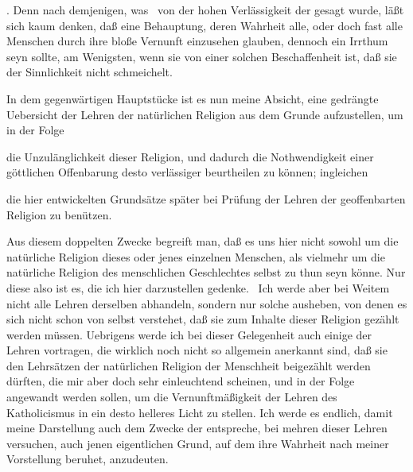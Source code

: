 \begin{aufza}
\begin{aufzb}
\begin{RWanm}
\end{RWanm}
\item {}. Denn nach demjenigen, was \ von der hohen Verlässigkeit der  gesagt wurde, läßt sich kaum denken, daß eine Behauptung, deren Wahrheit alle, oder doch fast alle Menschen durch ihre bloße Vernunft einzusehen glauben, dennoch ein Irrthum seyn sollte, am Wenigsten, wenn sie von einer solchen Beschaffenheit ist, daß sie der Sinnlichkeit nicht schmeichelt.
\end{aufzb}
\item In dem gegenwärtigen Hauptstücke ist es nun meine Absicht, eine gedrängte Uebersicht der Lehren der natürlichen Religion aus dem Grunde aufzustellen, um in der Folge
\begin{aufzb}
\item die Unzulänglichkeit dieser Religion, und dadurch die Nothwendigkeit einer göttlichen Offenbarung desto verlässiger beurtheilen zu können; ingleichen
\item die hier entwickelten Grundsätze später bei Prüfung der Lehren der geoffenbarten Religion zu benützen.
\end{aufzb}
Aus diesem doppelten Zwecke begreift man, daß es uns hier nicht sowohl um die natürliche Religion dieses oder jenes einzelnen Menschen, als vielmehr um die natürliche Religion des menschlichen Geschlechtes selbst zu thun seyn könne. Nur diese also ist es, die ich hier darzustellen gedenke.~ Ich werde aber bei Weitem nicht alle Lehren derselben abhandeln, sondern nur solche ausheben, von denen es sich nicht schon von selbst verstehet, daß sie zum Inhalte dieser Religion gezählt werden müssen. Uebrigens werde ich bei dieser Gelegenheit auch einige der Lehren vortragen, die wirklich noch nicht so allgemein anerkannt sind, daß sie den Lehrsätzen der natürlichen Religion der Menschheit beigezählt werden dürften, die mir aber doch sehr einleuchtend scheinen, und in der Folge angewandt werden sollen, um die Vernunftmäßigkeit der Lehren des Katholicismus in ein desto helleres Licht zu stellen. Ich werde es endlich, damit meine Darstellung auch dem Zwecke der  entspreche, bei mehren dieser Lehren versuchen, auch jenen eigentlichen Grund, auf dem ihre Wahrheit nach meiner Vorstellung beruhet, anzudeuten.
\end{aufza}


